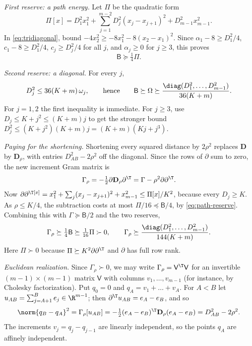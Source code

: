 \emph{First reserve: a path energy.} Let $\Pi$ be the quadratic form
\[
 \Pi[x]=D_1^2x_1^2+\sum_{j=1}^{m-2}D_j^2(x_j-x_{j+1})^2+D_{m-1}^2x_{m-1}^2.
\]
In \eqref{eq:tridiagonal}, bound $-4x_2^2\ge-8x_1^2-8(x_2-x_1)^2$. Since
$\alpha_1-8\ge D_1^2/4$, $c_1-8\ge D_1^2/4$, $c_j\ge D_j^2/4$ for all $j$,
and $\alpha_j\ge0$ for $j\ge3$, this proves
\begin{equation}\label{eq:path-reserve}
 \mathsf B\succeq\tfrac14\Pi.
\end{equation}

\emph{Second reserve: a diagonal.} For every $j$,
\begin{equation}\label{eq:diagonal-reserve}
 D_j^2\le36(K+m)\,\omega_j,
 \qquad\text{hence}\qquad
 \mathsf B\succeq\Omega\succeq\frac{\diag(D_1^2,\ldots,D_{m-1}^2)}{36(K+m)}.
\end{equation}
For $j=1,2$ the first inequality is immediate. For $j\ge3$, use
$D_j\le K+j^2\le(K+m)j$ to get the stronger bound
$D_j^2\le(K+j^2)(K+m)j=(K+m)(Kj+j^3)$.

\emph{Paying for the shortening.} Shortening every squared distance by
$2\rho^2$ replaces $\mathbf D$ by $\mathbf D_\rho$, with entries
$D_{AB}^2-2\rho^2$ off the diagonal. Since the rows of $\partial$ sum to
zero, the new increment Gram matrix is
\[
 \Gamma_\rho=-\tfrac12\partial\mathbf D_\rho\partial^\T
 =\Gamma-\rho^2\partial\partial^\T.
\]
Now $\partial\partial^\T[x]=x_1^2+\sum_j(x_j-x_{j+1})^2+x_{m-1}^2\le
\Pi[x]/K^2$, because every $D_j\ge K$. As $\rho\le K/4$, the subtraction
costs at most $\Pi/16\preceq\mathsf B/4$, by \eqref{eq:path-reserve}.
Combining this with $\Gamma\succeq\mathsf B/2$ and the two reserves,
\begin{equation}\label{eq:both-reserves}
 \Gamma_\rho\succeq\tfrac14\mathsf B\succeq\tfrac1{16}\Pi\succ0,
 \qquad
 \Gamma_\rho\succeq
     \frac{\diag(D_1^2,\ldots,D_{m-1}^2)}{144(K+m)}.
\end{equation}
Here $\Pi\succ0$ because $\Pi\succeq K^2\partial\partial^\T$ and $\partial$
has full row rank.

\emph{Euclidean realization.} Since $\Gamma_\rho\succ0$, we may write
$\Gamma_\rho=\mathsf V^\T\mathsf V$ for an invertible
$(m-1)\times(m-1)$ matrix $\mathsf V$ with columns $v_1,\dots,v_{m-1}$
(for instance, by Cholesky factorization). Put $q_0=0$ and
$q_A=v_1+\dots+v_A$. For $A<B$ let $u_{AB}=\sum_{j=A+1}^Be_j\in\R^{m-1}$;
then $\partial^\T u_{AB}=e_A-e_B$, and so
\[
 \norm{q_B-q_A}^2
 =\Gamma_\rho[u_{AB}]
 =-\tfrac12(e_A-e_B)^\T\mathbf D_\rho(e_A-e_B)
 =D_{AB}^2-2\rho^2.
\]
The increments $v_j=q_j-q_{j-1}$ are linearly independent, so the points
$q_A$ are affinely independent.

